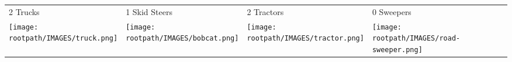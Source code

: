\begin{tabular}{m{}m{}m{}m{}}
    {\color{ccorange} 2 Trucks} & {\color{ccorange} 1 Skid Steers} & {\color{ccorange} 2 Tractors} & {\color{ccorange} 0 Sweepers} \\
    \texttt{[image: \\rootpath/IMAGES/truck.png]}  & \texttt{[image: \\rootpath/IMAGES/bobcat.png]} & \texttt{[image: \\rootpath/IMAGES/tractor.png]} & \texttt{[image: \\rootpath/IMAGES/road-sweeper.png]}                         
    \end{tabular}